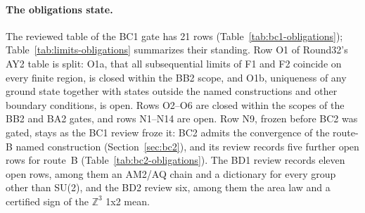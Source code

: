 \paragraph{The obligations state.} The reviewed table of the BC1 gate has 21
rows (Table~\ref{tab:bc1-obligations}); Table~\ref{tab:limits-obligations}
summarizes their standing. Row O1 of Round32's AY2 table is split: O1a, that
all subsequential limits of F1 and F2 coincide on every finite region, is
closed within the BB2 scope, and O1b, uniqueness of any ground state together
with states outside the named constructions and other boundary conditions,
is open. Rows O2--O6 are closed within the scopes of the BB2 and BA2 gates,
and rows N1--N14 are open. Row N9, frozen before BC2 was gated, stays as the
BC1 review froze it: BC2 admits the convergence of the route-B named
construction (Section~\ref{sec:bc2}), and its review records five further open
rows for route~B (Table~\ref{tab:bc2-obligations}). The BD1 review records
eleven open rows, among them an AM2/AQ chain and a dictionary for every group
other than SU(2), and the BD2 review six, among them the area law and a
certified sign of the $\mathbb Z^3$ 1x2 mean.

